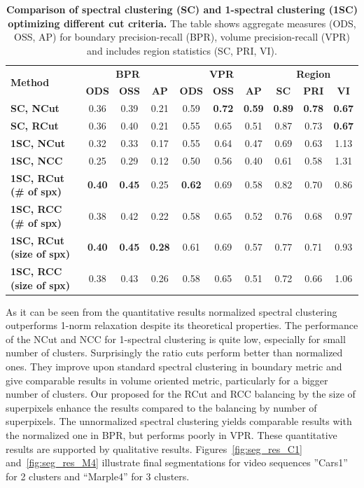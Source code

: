 \begin{table}[htbp]
\renewcommand{\arraystretch}{1.3}
\centering
\scriptsize
\begin{tabular}{|l||c|c|c||c|c|c||c|c|c||}
\hline 
\multirow{2}{*}{\textbf{Method}} & \multicolumn{3}{c||}{\textbf{BPR}} & \multicolumn{3}{c||}{\textbf{VPR}}& \multicolumn{3}{c||}{\textbf{Region}}\\
\cline{2-10}
& \textbf{ODS}  & \textbf{OSS} & \textbf{AP}
& \textbf{ODS} & \textbf{OSS} & \textbf{AP}
& \textbf{SC} & \textbf{PRI} & \textbf{VI} \\
\hline
\hline
\textbf{SC, NCut} & 0.36 & 0.39 & 0.21 & 0.59 &\textbf{0.72} & \textbf{0.59} & \textbf{0.89} & \textbf{0.78} & \textbf{0.67} \\
\hline
\textbf{SC, RCut} & 0.36 & 0.40 & 0.21 & 0.55 & 0.65 & 0.51 & 0.87 & 0.73 & \textbf{0.67} \\
\hline
\hline
\textbf{1SC, NCut} & 0.32 & 0.33 & 0.17 & 0.55 & 0.64 & 0.47 & 0.69 & 0.63 & 1.13 \\
\hline
\textbf{1SC, NCC} & 0.25 & 0.29 & 0.12 & 0.50 & 0.56 & 0.40 & 0.61 & 0.58 & 1.31 \\
\hline
\textbf{1SC, RCut (\# of spx)} &\textbf{0.40} & \textbf{0.45} & 0.25 & \textbf{0.62} & 0.69 & 0.58 & 0.82 & 0.70 & 0.86 \\
\hline
\textbf{1SC, RCC (\# of spx)} & 0.38 & 0.42 & 0.22 & 0.58 & 0.65 & 0.52 & 0.76 & 0.68 & 0.97 \\
\hline
\textbf{1SC, RCut (size of spx)} & \textbf{0.40} & \textbf{0.45} & \textbf{0.28} & 0.61 & 0.69 & 0.57 & 0.77 & 0.71 & 0.93 \\
\hline
\textbf{1SC, RCC (size of spx)} & 0.38 & 0.43 & 0.26 & 0.58 & 0.65 & 0.51 & 0.72 & 0.66 & 1.06 \\
\hline
\end{tabular}
 \caption{{\bf Comparison of spectral clustering (SC) and 1-spectral clustering (1SC) optimizing different cut criteria.} 
The table shows aggregate measures (ODS, OSS, AP) for boundary precision-recall (BPR), volume precision-recall (VPR) and 
includes region statistics (SC, PRI, VI).}
\label{tab:sc_comparison}
\end{table}
As it can be seen from the quantitative results normalized spectral clustering outperforms 1-norm relaxation despite its theoretical properties. The performance of the NCut and NCC for 1-spectral clustering is quite low,
especially for small number of clusters. Surprisingly the ratio cuts perform better than normalized ones. They improve upon standard spectral clustering in boundary metric and give comparable results in volume oriented metric, 
particularly for a bigger number of clusters. Our proposed for the RCut and RCC balancing by the size of superpixels enhance the results compared to the balancing by number of superpixels. 
The unnormalized spectral clustering yields comparable results with the normalized one in BPR, but performs poorly in VPR. 
\newpage
These quantitative results are supported by qualitative results. Figures~\ref{fig:seg_res_C1} and~\ref{fig:seg_res_M4} illustrate final segmentations for video sequences ''Cars1'' for 2 clusters and ``Marple4'' for 3 clusters.

